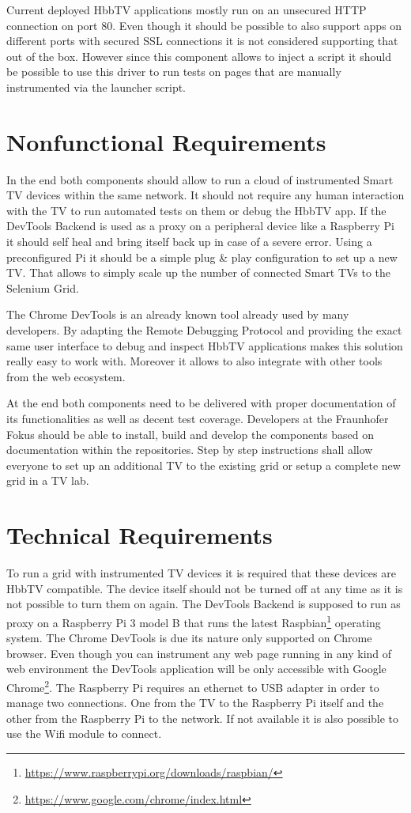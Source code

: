 Current deployed HbbTV applications mostly run on an unsecured HTTP connection on port 80. Even though it should be possible to also support apps on different ports with secured SSL connections it is not considered supporting that out of the box. However since this component allows to inject a script it should be possible to use this driver to run tests on pages that are manually instrumented via the launcher script.

\section{Nonfunctional Requirements\label{sec:techreq}}

In the end both components should allow to run a cloud of instrumented Smart TV devices within the same network. It should not require any human interaction with the TV to run automated tests on them or debug the HbbTV app. If the DevTools Backend is used as a proxy on a peripheral device like a Raspberry Pi it should self heal and bring itself back up in case of a severe error. Using a preconfigured Pi it should be a simple plug \& play configuration to set up a new TV. That allows to simply scale up the number of connected Smart TVs to the Selenium Grid.

The Chrome DevTools is an already known tool already used by many developers. By adapting the Remote Debugging Protocol and providing the exact same user interface to debug and inspect HbbTV applications makes this solution really easy to work with. Moreover it allows to also integrate with other tools from the web ecosystem.

At the end both components need to be delivered with proper documentation of its functionalities as well as decent test coverage. Developers at the Fraunhofer Fokus should be able to install, build and develop the components based on documentation within the repositories. Step by step instructions shall allow everyone to set up an additional TV to the existing grid or setup a complete new grid in a TV lab.

\section{Technical Requirements\label{sec:techreq}}

To run a grid with instrumented TV devices it is required that these devices are HbbTV compatible. The device itself should not be turned off at any time as it is not possible to turn them on again. The DevTools Backend is supposed to run as proxy on a Raspberry Pi 3 model B that runs the latest Raspbian\footnote{\url{https://www.raspberrypi.org/downloads/raspbian/}} operating system. The Chrome DevTools is due its nature only supported on Chrome browser. Even though you can instrument any web page running in any kind of web environment the DevTools application will be only accessible with Google Chrome\footnote{\url{https://www.google.com/chrome/index.html}}. The Raspberry Pi requires an ethernet to USB adapter in order to manage two connections. One from the TV to the Raspberry Pi itself and the other from the Raspberry Pi to the network. If not available it is also possible to use the Wifi module to connect.


